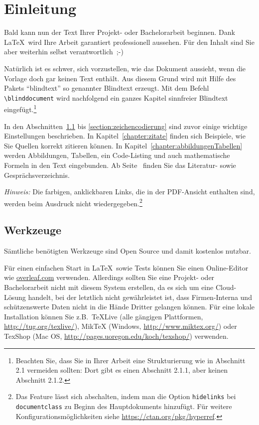 \chapter{Einleitung}

Bald kann nun der Text Ihrer Projekt- oder Bachelorarbeit beginnen. Dank \LaTeX\ wird Ihre Arbeit garantiert professionell aussehen. Für den Inhalt sind Sie aber weiterhin selbst verantwortlich~\mbox{;-)}

Natürlich ist es schwer, sich vorzustellen, wie das Dokument aussieht, wenn die Vorlage doch gar keinen Text enthält. Aus diesem Grund wird mit Hilfe des Pakets \enquote{blindtext} so genannter Blindtext erzeugt. Mit dem Befehl \verb|\blinddocument| wird nachfolgend ein ganzes Kapitel sinnfreier Blindtext eingefügt.\footnote{Beachten Sie, dass Sie in Ihrer Arbeit eine Strukturierung wie in Abschnitt 2.1 vermeiden sollten: Dort gibt es einen Abschnitt 2.1.1, aber keinen Abschnitt 2.1.2.} 

In den Abschnitten~\ref{section:werkzeuge} bis \ref{section:zeichencodierung} sind zuvor einige wichtige Einstellungen beschrieben. In Kapitel~\ref{chapter:zitate} finden sich Beispiele, wie Sie Quellen korrekt zitieren können. In Kapitel~\ref{chapter:abbildungenTabellen} werden Abbildungen, Tabellen, ein Code-Listing und auch mathematische Formeln in den Text eingebunden. Ab Seite~\pageref{chapter:quellen} finden Sie das Literatur- sowie Gesprächsverzeichnis.

\emph{Hinweis:} Die farbigen, anklickbaren Links, die in der PDF-Ansicht enthalten sind, werden beim Ausdruck nicht wiedergegeben.\footnote{Das Feature lässt sich abschalten, indem man die Option \texttt{hidelinks} bei \texttt{documentclass} zu Beginn des Hauptdokuments hinzufügt. Für weitere Konfigurationsmöglichkeiten siehe \url{https://ctan.org/pkg/hyperref}.}

\section{Werkzeuge}\label{section:werkzeuge}

Sämtliche benötigten Werkzeuge sind Open Source und damit kostenlos nutzbar.

Für einen einfachen Start in \LaTeX\ sowie Tests können Sie einen Online-Editor wie \url{overleaf.com} verwenden. Allerdings sollten Sie eine Projekt- oder Bachelorarbeit nicht mit diesem System erstellen, da es sich um eine Cloud-Lösung handelt, bei der letztlich nicht gewährleistet ist, dass Firmen-Interna und schützenswerte Daten nicht in die Hände Dritter gelangen können. Für eine lokale Installation können Sie z.B.\ TeXLive (alle gängigen Plattformen, \url{http://tug.org/texlive/}), MikTeX (Windows, \url{http://www.miktex.org/}) oder TexShop (Mac OS, \url{http://pages.uoregon.edu/koch/texshop/}) verwenden.

